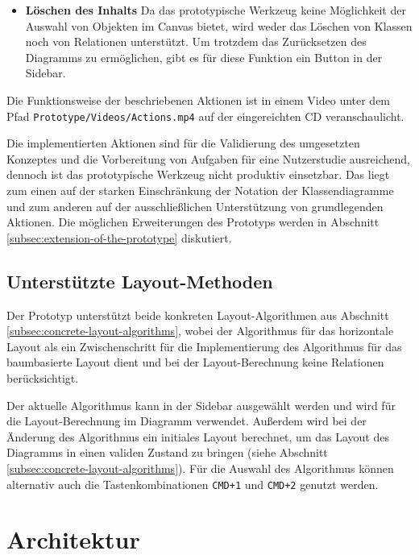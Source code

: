 \begin{itemize}
\item
\textbf{Löschen des Inhalts}
Da das prototypische Werkzeug keine Möglichkeit der Auswahl von Objekten im Canvas bietet, wird weder das Löschen von Klassen noch von Relationen unterstützt. Um trotzdem das Zurücksetzen des Diagramms zu ermöglichen, gibt es für diese Funktion ein Button in der Sidebar.

\end{itemize}

Die Funktionsweise der beschriebenen Aktionen ist in einem Video unter dem Pfad \texttt{Proto\-type/Videos/Actions.mp4} auf der eingereichten CD veranschaulicht.

Die implementierten Aktionen sind für die Validierung des umgesetzten Konzeptes und die Vorbereitung von Aufgaben für eine Nutzerstudie ausreichend, dennoch ist das prototypische Werkzeug nicht produktiv einsetzbar. Das liegt zum einen auf der starken Einschränkung der Notation der Klassendiagramme und zum anderen auf der ausschließlichen Unterstützung von grundlegenden Aktionen. Die möglichen Erweiterungen des Prototyps werden in Abschnitt \ref{subsec:extension-of-the-prototype} diskutiert.

\subsection{Unterstützte Layout-Methoden}
\label{subsec:supported-layout-methods}

Der Prototyp unterstützt beide konkreten Layout-Algorithmen aus Abschnitt \ref{subsec:concrete-layout-algorithms}, wobei der Algorithmus für das horizontale Layout als ein Zwischenschritt für die Implementierung des Algorithmus für das baumbasierte Layout dient und bei der Layout-Berechnung keine Relationen berücksichtigt.

Der aktuelle Algorithmus kann in der Sidebar ausgewählt werden und wird für die Layout-Berechnung im Diagramm verwendet. Außerdem wird bei der Änderung des Algorithmus ein initiales Layout berechnet, um das Layout des Diagramms in einen validen Zustand zu bringen (siehe Abschnitt \ref{subsec:concrete-layout-algorithms}). Für die Auswahl des Algorithmus können alternativ auch die Tastenkombinationen \texttt{CMD+1} und \texttt{CMD+2} genutzt werden.

\section{Architektur}
\label{sec:architecture}

